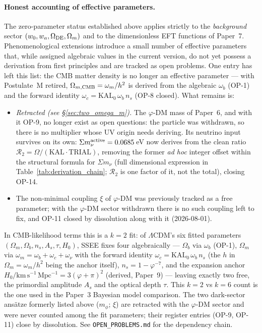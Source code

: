 \documentclass[12pt,a4paper]{article}
\newcommand{\kmsu}{\mathrm{km\,s^{-1}\,Mpc^{-1}}}
\begin{document}
\paragraph{Honest accounting of effective parameters.}
The zero-parameter status established above applies strictly to the
\emph{background} sector $(w_0,w_a,\Omega_{\rm DE},\Omega_m)$ and to
the dimensionless EFT functions of Paper~7. Phenomenological extensions
introduce a small number of effective parameters that, while assigned
algebraic values in the current version, do not yet possess a derivation from
first principles and are tracked as open problems. One entry has left this list:
the CMB matter density is no longer an effective parameter --- with Postulate~M
retired, $\Omega_{m,\rm CMB}=\omega_m/h^2$ is derived from the algebraic
$\omega_b$ (OP-1) and the forward identity
$\omega_c=\mathrm{KAL}_0\,\omega_b\,n_s$ (OP-8 closed). What remains is:
\begin{itemize}\itemsep1pt
  \item \emph{Retracted (see \S\ref{sec:two_omega_m}).} The $\varphi$-DM mass
        of Paper~6, and with it OP-9, no longer exist as open questions: the
        particle was withdrawn, so there is no multiplier whose UV origin needs
        deriving. Its neutrino input survives on its own: 
        $\Sigma m_\nu^{\rm active}=0.0685$\,eV now derives from the clean ratio
        $\mathcal{R}_2=\Omega/(\mathrm{KAL}\cdot\mathrm{TRIAL})$, removing the
        former \emph{ad hoc} integer offset within the structural formula
        for $\Sigma m_\nu$ (full dimensional expression in
        Table~\ref{tab:derivation_chain}; $\mathcal{R}_2$ is one factor of it,
        not the total), closing OP-14.
  \item The non-minimal coupling $\xi$ of $\varphi$-DM was previously tracked
        as a free parameter; with the $\varphi$-DM sector withdrawn there is no
        such coupling left to fix, and OP-11 closed by dissolution along with
        it (2026-08-01).
\end{itemize}
In CMB-likelihood terms this is a $k=2$ fit: of $\Lambda$CDM's six fitted
parameters $(\Omega_m,\Omega_b,n_s,A_s,\tau,H_0)$, SSEE fixes four
algebraically --- $\Omega_b$ via $\omega_b$ (OP-1), $\Omega_m$ via
$\omega_m=\omega_b+\omega_c+\omega_\nu$ with the forward identity
$\omega_c=\mathrm{KAL}_0\,\omega_b\,n_s$ (the $h$ in $\Omega_m=\omega_m/h^2$
being the anchor itself), $n_s=1-\varphi^{-7}$, and the expansion
anchor $H_0/\kmsu=3(\varphi+\pi)^2$ (derived, Paper~9) --- leaving exactly two free,
the primordial amplitude $A_s$ and the optical depth $\tau$. This $k=2$ vs $k=6$
count is the one used in the Paper~3 Bayesian model comparison. The two
dark-sector ans\"atze formerly listed above ($m_\phi$; $\xi$) are retracted with
the $\varphi$-DM sector and were never counted among the fit parameters; their
register entries (OP-9, OP-11) close by dissolution. See \texttt{OPEN\_PROBLEMS.md} for
the dependency chain.
\end{document}
